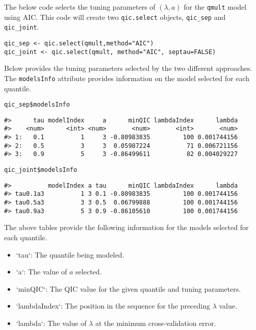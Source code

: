 The below code selects the tuning parameters of \((\lambda,a)\) for the \texttt{qmult} model using AIC. This code will create two \texttt{qic.select} objects, \texttt{qic\_sep} and \texttt{qic\_joint}.

\begin{verbatim}
qic_sep <- qic.select(qmult,method="AIC")
qic_joint <- qic.select(qmult, method="AIC", septau=FALSE)
\end{verbatim}

Below provides the tuning parameters selected by the two different approaches. The \texttt{modelsInfo} attribute provides information on the model selected for each quantile.

\begin{verbatim}
qic_sep$modelsInfo
\end{verbatim}

\begin{verbatim}
#>      tau modelIndex     a      minQIC lambdaIndex      lambda
#>    <num>      <int> <num>       <num>       <int>       <num>
#> 1:   0.1          1     3 -0.80983835         100 0.001744156
#> 2:   0.5          3     3  0.05987224          71 0.006721156
#> 3:   0.9          5     3 -0.86499611          82 0.004029227
\end{verbatim}

\begin{verbatim}
qic_joint$modelsInfo
\end{verbatim}

\begin{verbatim}
#>          modelIndex a tau      minQIC lambdaIndex      lambda
#> tau0.1a3          1 3 0.1 -0.80983835         100 0.001744156
#> tau0.5a3          3 3 0.5  0.06799888         100 0.001744156
#> tau0.9a3          5 3 0.9 -0.86105610         100 0.001744156
\end{verbatim}

The above tables provide the following information for the models selected for each quantile.

\begin{itemize}
\item `tau`: The quantile being modeled.
\item `a`: The value of $a$ selected.
\item `minQIC`: The QIC value for the given quantile and tuning parameters.
\item `lambdaIndex`: The position in the sequence for the preceding $\lambda$ value.
\item `lambda`: The value of $\lambda$ at the minimum cross-validation error.
\end{itemize}

